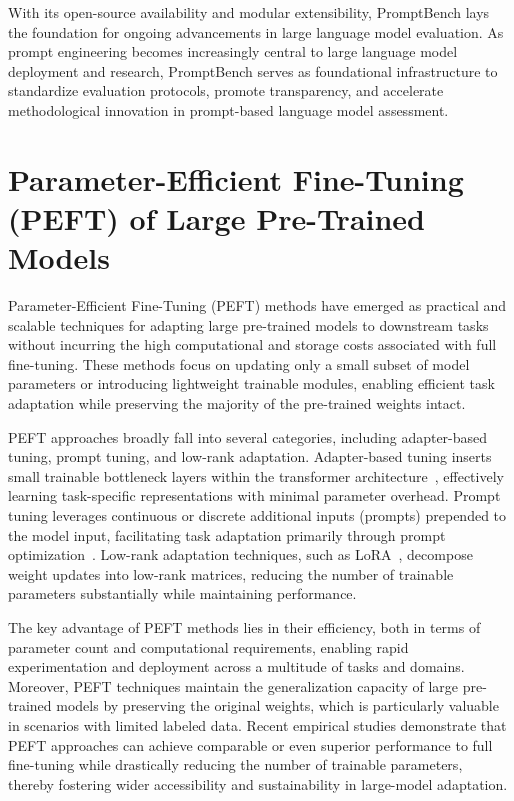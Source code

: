 \documentclass[sigconf]{acmart}
\begin{document}
With its open-source availability and modular extensibility, PromptBench lays the foundation for ongoing advancements in large language model evaluation. As prompt engineering becomes increasingly central to large language model deployment and research, PromptBench serves as foundational infrastructure to standardize evaluation protocols, promote transparency, and accelerate methodological innovation in prompt-based language model assessment.

\section{Parameter-Efficient Fine-Tuning (PEFT) of Large Pre-Trained Models}
Parameter-Efficient Fine-Tuning (PEFT) methods have emerged as practical and scalable techniques for adapting large pre-trained models to downstream tasks without incurring the high computational and storage costs associated with full fine-tuning. These methods focus on updating only a small subset of model parameters or introducing lightweight trainable modules, enabling efficient task adaptation while preserving the majority of the pre-trained weights intact.

PEFT approaches broadly fall into several categories, including adapter-based tuning, prompt tuning, and low-rank adaptation. Adapter-based tuning inserts small trainable bottleneck layers within the transformer architecture~\cite{adaptercitation}, effectively learning task-specific representations with minimal parameter overhead. Prompt tuning leverages continuous or discrete additional inputs (prompts) prepended to the model input, facilitating task adaptation primarily through prompt optimization~\cite{prompttuningcitation}. Low-rank adaptation techniques, such as LoRA~\cite{loracitation}, decompose weight updates into low-rank matrices, reducing the number of trainable parameters substantially while maintaining performance.

The key advantage of PEFT methods lies in their efficiency, both in terms of parameter count and computational requirements, enabling rapid experimentation and deployment across a multitude of tasks and domains. Moreover, PEFT techniques maintain the generalization capacity of large pre-trained models by preserving the original weights, which is particularly valuable in scenarios with limited labeled data. Recent empirical studies demonstrate that PEFT approaches can achieve comparable or even superior performance to full fine-tuning while drastically reducing the number of trainable parameters, thereby fostering wider accessibility and sustainability in large-model adaptation.
\end{document}
